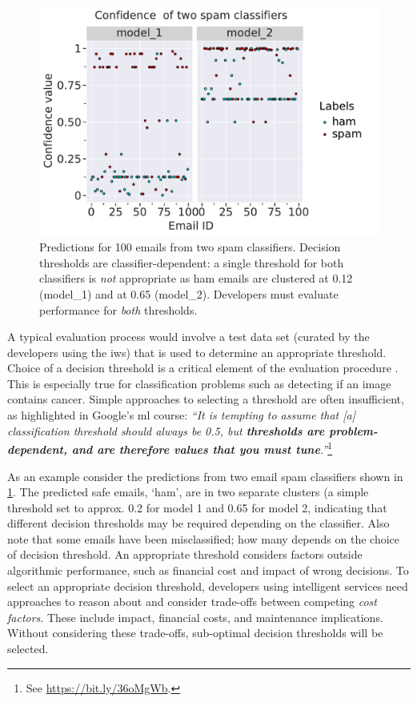 \begin{figure}[t]
    \centering
    \includegraphics[width=.75\linewidth]{scatter.pdf}
    \caption[Example case study of evaluating model performance in two different models]{Predictions for 100 emails from two spam classifiers. Decision thresholds are classifier-dependent:  a single threshold for both classifiers is \textit{not} appropriate as ham emails are clustered at 0.12 (model\_1) and at 0.65 (model\_2). Developers must evaluate  performance for \textit{both} thresholds.}
    \label{fse-demo2020:fig:example}
\end{figure}

A typical evaluation process would involve a test data set (curated by the developers using the \gls{iws}) that is used to determine an appropriate threshold. Choice of a decision threshold is a critical element of the evaluation procedure \citep{hardt2016equality}. This is especially true for classification problems such as detecting if an image contains cancer. Simple approaches to selecting a threshold are often insufficient, as highlighted in Google's \gls{ml} course: \textit{``It is tempting to assume that [a] classification threshold should always be 0.5, but \textbf{thresholds are problem-dependent, and are therefore values that you must tune}.''}\footnote{See \url{https://bit.ly/36oMgWb}.} 

As an example consider the predictions from two email spam classifiers shown in \cref{fse-demo2020:fig:example}. The predicted safe emails, `ham', are in two separate clusters (a simple threshold set to approx. 0.2 for model 1 and 0.65 for model 2, indicating that different decision thresholds may be required depending on the classifier. Also note that some emails have been misclassified; how many depends on the choice of decision threshold. An appropriate threshold considers factors outside algorithmic performance, such as financial cost and impact of wrong decisions. To select an appropriate decision threshold, developers using intelligent services need approaches to reason about and consider trade-offs between competing \textit{cost factors}. These include impact, financial costs, and maintenance implications. Without considering these trade-offs, sub-optimal decision thresholds will be selected.   

